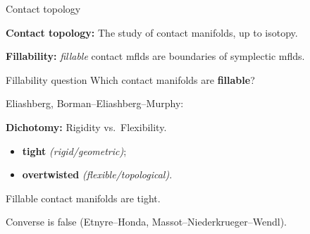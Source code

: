 \documentclass{beamer}
\begin{document}
\begin{frame}{Contact topology}

\textbf{Contact topology:} The study of contact manifolds, up to isotopy.

\medskip

\pause

\textbf{Fillability:} \emph{fillable} contact mflds are boundaries of symplectic mflds.

\pause

\begin{exampleblock}{Fillability question}  Which contact manifolds are \textbf{fillable}?
\end{exampleblock}

\pause

Eliashberg, Borman--Eliashberg--Murphy:

\begin{tcolorbox}
\textbf{Dichotomy:} Rigidity vs.\ Flexibility. 
\begin{itemize}
    \item \textbf{tight} \emph{(rigid/geometric)};
    \item  \textbf{overtwisted} \emph{(flexible/topological)}. 
\end{itemize}
\end{tcolorbox} 

\pause

\begin{theorem}
Fillable contact manifolds are tight.
\end{theorem}

Converse is false (Etnyre--Honda, Massot--Niederkrueger--Wendl).

\end{frame}

\end{document}
